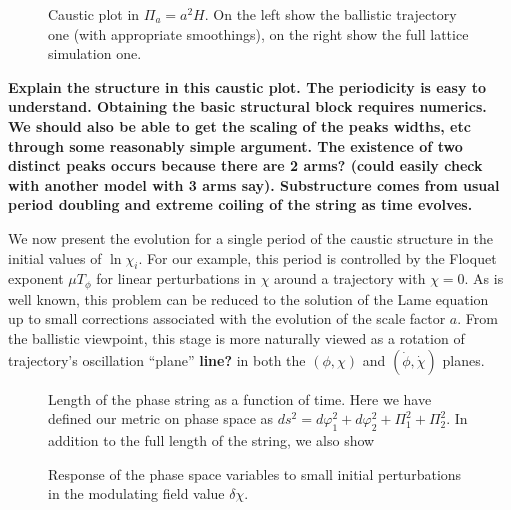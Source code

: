 
\begin{figure}
  \caption{Caustic plot in $\Pi_a = a^2H$.  On the left show the ballistic trajectory one (with appropriate smoothings), on the right show the full lattice simulation one.}
\end{figure}
{\bf Explain the structure in this caustic plot.  The periodicity is easy to understand.  Obtaining the basic structural block requires numerics.  We should also be able to get the scaling of the peaks widths, etc through some reasonably simple argument.  The existence of two distinct peaks occurs because there are 2 arms? (could easily check with another model with 3 arms say).  Substructure comes from usual period doubling and extreme coiling of the string as time evolves.}

We now present the evolution for a single period of the caustic structure in the initial values of $\ln\chi_i$.
For our example, this period is controlled by the Floquet exponent $\mu T_\phi$ for linear perturbations in $\chi$ around a trajectory with $\chi=0$.
As is well known, this problem can be reduced to the solution of the Lame equation~\cite{KofmanGreene} up to small corrections associated with the evolution of the scale factor $a$.
From the ballistic viewpoint, this stage is more naturally viewed as a rotation of trajectory's oscillation ``plane'' {\bf line?} in both the $(\phi,\chi)$ and $(\dot{\phi},\dot{\chi})$ planes.

\begin{figure}
  \caption{Length of the phase string as a function of time.  Here we have defined our metric on phase space as $ds^2 = d\varphi_1^2+d\varphi_2^2 + \Pi_1^2 + \Pi_2^2$.  In addition to the full length of the string, we also show }
\end{figure}

\begin{figure}
  \caption{Response of the phase space variables to small initial perturbations in the modulating field value $\delta\chi$.}
\end{figure}

